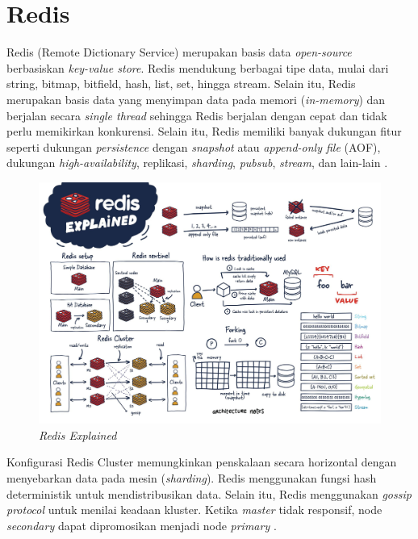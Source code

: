 \section{Redis}

Redis (Remote Dictionary Service) merupakan basis data \textit{open-source} berbasiskan \textit{key-value store}. Redis mendukung berbagai tipe data, mulai dari string, bitmap, bitfield, hash, list, set, hingga stream. Selain itu, Redis merupakan basis data yang menyimpan data pada memori (\textit{in-memory}) dan berjalan secara \textit{single thread} sehingga Redis berjalan dengan cepat dan tidak perlu memikirkan konkurensi. Selain itu, Redis memiliki banyak dukungan fitur seperti dukungan \textit{persistence} dengan \textit{snapshot} atau \textit{append-only file} (AOF), dukungan \textit{high-availability}, replikasi, \textit{sharding}, \textit{pubsub}, \textit{stream}, dan lain-lain \parencite{redisExplained}.

\begin{figure}[htbp]
    \centering
    \includegraphics[width=1\textwidth]{resources/chapter-2/redis.jpg}
    \caption{\textit{Redis Explained \parencite{redisExplained}}}
    \label{fig:redis-explained}
\end{figure}

Konfigurasi Redis Cluster memungkinkan penskalaan secara horizontal dengan menyebarkan data pada mesin (\textit{sharding}). Redis menggunakan fungsi hash deterministik untuk mendistribusikan data. Selain itu, Redis menggunakan \textit{gossip protocol} untuk menilai keadaan kluster. Ketika \textit{master} tidak responsif, node \textit{secondary} dapat dipromosikan menjadi node \textit{primary} \parencite{redisExplained}.